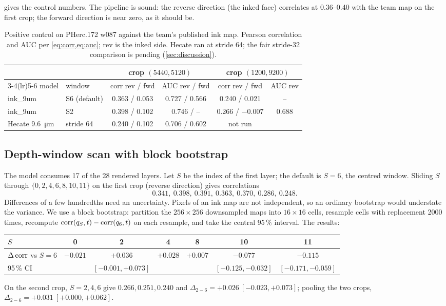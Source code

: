  gives the control numbers. The pipeline is sound: the reverse direction (the inked face) correlates at \numrange{0.36}{0.40} with the team map on the first crop; the forward direction is near zero, as it should be.

\begin{table}[t]
\centering\small
\caption{Positive control on PHerc.172 w087 against the team's published ink map. Pearson correlation and AUC per \cref{eq:corr,eq:auc}; rev is the inked side. Hecate ran at stride 64; the fair stride-32 comparison is pending (\cref{sec:discussion}).}
\label{tab:control}
\begin{tabular}{@{}llcccc@{}}
\toprule
& & \multicolumn{2}{c}{crop $(5440,5120)$} & \multicolumn{2}{c}{crop $(1200,9200)$}\\
\cmidrule(lr){3-4}\cmidrule(lr){5-6}
model & window & corr rev / fwd & AUC rev / fwd & corr rev / fwd & AUC rev\\
\midrule
ink\_9um & S6 (default) & 0.363 / 0.053 & 0.727 / 0.566 & 0.240 / 0.021 & --\\
ink\_9um & S2 & 0.398 / 0.102 & 0.746 / -- & 0.266 / $-0.007$ & 0.688\\
Hecate \SI{9.6}{\um} & stride 64 & 0.240 / 0.102 & 0.706 / 0.602 & not run & \\
\bottomrule
\end{tabular}
\end{table}

\subsection{Depth-window scan with block bootstrap}
The model consumes 17 of the 28 rendered layers. Let $S$ be the index of the first layer; the default is $S=6$, the centred window. Sliding $S$ through $\{0,2,4,6,8,10,11\}$ on the first crop (reverse direction) gives correlations
\[
0.341,\ 0.398,\ 0.391,\ 0.363,\ 0.370,\ 0.286,\ 0.248 .
\]
Differences of a few hundredths need an uncertainty. Pixels of an ink map are not independent, so an ordinary bootstrap would understate the variance. We use a block bootstrap: partition the $256\times256$ downsampled maps into $16\times16$ cells, resample cells with replacement 2000 times, recompute $\operatorname{corr}(q_S,t)-\operatorname{corr}(q_6,t)$ on each resample, and take the central 95\,\% interval. The results:
\begin{center}\small
\begin{tabular}{@{}lcccccc@{}}
\toprule
$S$ & 0 & 2 & 4 & 8 & 10 & 11\\
\midrule
$\Delta\operatorname{corr}$ vs $S=6$ & $-0.021$ & $+0.036$ & $+0.028$ & $+0.007$ & $-0.077$ & $-0.115$\\
95\,\% CI & & $[-0.001,+0.073]$ & & & $[-0.125,-0.032]$ & $[-0.171,-0.059]$\\
\bottomrule
\end{tabular}
\end{center}
On the second crop, $S=2,4,6$ give $0.266,0.251,0.240$ and $\Delta_{2-6}=+0.026\ [-0.023,+0.073]$; pooling the two crops, $\Delta_{2-6}=+0.031\ [+0.000,+0.062]$.

